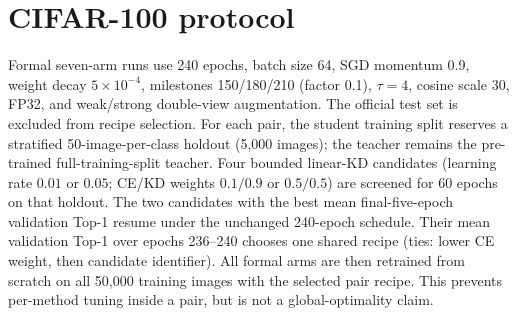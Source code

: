 \documentclass[10pt]{article}
\begin{document}
\section{CIFAR-100 protocol}
Formal seven-arm runs use 240 epochs, batch size 64, SGD momentum 0.9, weight decay $5\times10^{-4}$, milestones 150/180/210 (factor 0.1), $\tau=4$, cosine scale 30, FP32, and weak/strong double-view augmentation. The official test set is excluded from recipe selection. For each pair, the student training split reserves a stratified 50-image-per-class holdout (5,000 images); the teacher remains the pre-trained full-training-split teacher. Four bounded linear-KD candidates (learning rate $0.01$ or $0.05$; CE/KD weights $0.1/0.9$ or $0.5/0.5$) are screened for 60 epochs on that holdout. The two candidates with the best mean final-five-epoch validation Top-1 resume under the unchanged 240-epoch schedule. Their mean validation Top-1 over epochs 236--240 chooses one shared recipe (ties: lower CE weight, then candidate identifier). All formal arms are then retrained from scratch on all 50,000 training images with the selected pair recipe. This prevents per-method tuning inside a pair, but is not a global-optimality claim.
\end{document}
